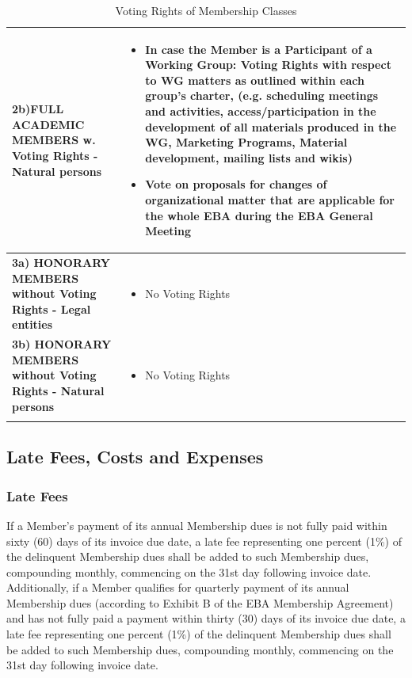 \documentclass{article}
\begin{document}
\begin{longtable}{| p{} | p{} |}
   	\textbf{2b)FULL ACADEMIC MEMBERS w. Voting Rights - Natural persons} &
   	\begin{itemize}
   		\item In case the Member is a Participant of a Working Group: Voting Rights with respect to WG matters as outlined within each group's charter, (e.g. scheduling meetings and activities, access/participation in the development of all materials produced in the WG, Marketing Programs, Material development, mailing lists and wikis)
   		\item Vote on proposals for changes of organizational matter that are applicable for the whole EBA during the EBA General Meeting
   	\end{itemize}\\ \hline
    	
   	\textbf{3a) HONORARY MEMBERS without Voting Rights - Legal entities} &
   	\begin{itemize}
   		\item No Voting Rights
   	\end{itemize}\\ \hline
    	
   	\textbf{3b) HONORARY MEMBERS without Voting Rights - Natural persons} &
   	\begin{itemize}
   		\item No Voting Rights
   	\end{itemize}\\ \hline 
	    	
	\caption{Voting Rights of Membership Classes}
	\label{table:Mem_Voting}
\end{longtable}

\subsection{Late Fees, Costs and Expenses}

\subsubsection{Late Fees}

If a Member’s payment of its annual Membership dues is not fully paid within sixty (60) days of its invoice due date, a late fee representing one percent (1\%) of the delinquent Membership dues shall be added to such Membership dues, compounding monthly, commencing on the 31st day following invoice date. 
Additionally, if a Member qualifies for quarterly payment of its annual Membership dues (according to Exhibit B of the EBA Membership Agreement) and has not fully paid a payment within thirty (30) days of its invoice due date, a late fee representing one percent (1\%) of the delinquent Membership dues shall be added to such Membership dues, compounding monthly, commencing on the 31st day following invoice date.
\end{document}
